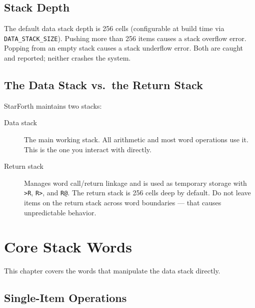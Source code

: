 \section{Stack Depth}
\label{sec:stack-depth}

The default data stack depth is 256 cells (configurable at build time via
\texttt{DATA\_STACK\_SIZE}). Pushing more than 256 items causes a stack
overflow error. Popping from an empty stack causes a stack underflow error.
Both are caught and reported; neither crashes the system.

\section{The Data Stack vs.\ the Return Stack}
\label{sec:two-stacks}

StarForth maintains two stacks:

\begin{description}
  \item[Data stack] The main working stack. All arithmetic and most word
    operations use it. This is the one you interact with directly.
  \item[Return stack] Manages word call/return linkage and is used as
    temporary storage with \texttt{>R}, \texttt{R>}, and \texttt{R@}.
    The return stack is 256 cells deep by default. Do not leave items on the
    return stack across word boundaries --- that causes unpredictable
    behavior.
\end{description}

\chapter{Core Stack Words}
\label{chap:core-stack}

This chapter covers the words that manipulate the data stack directly.

\section{Single-Item Operations}
\label{sec:single-stack}

